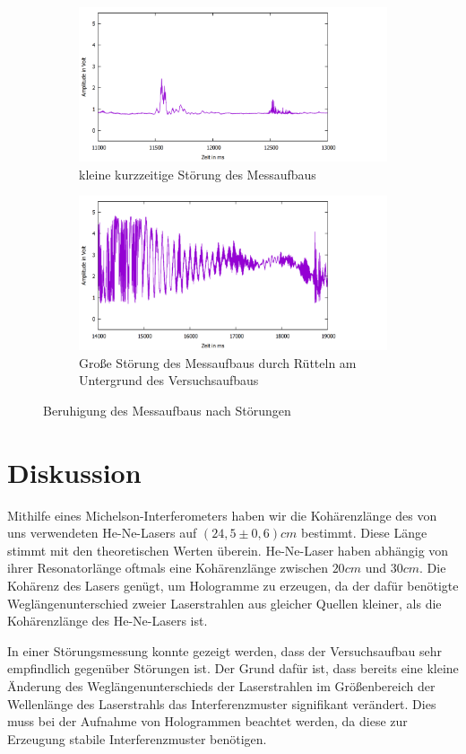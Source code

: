 \documentclass[10pt,a4paper]{article}
\begin{document}
	\begin{figure}[h]
		\centering
		\begin{subfigure}{0.8\textwidth}
			\centering
			\includegraphics[width=\textwidth]{abklingzeit1.png}
			\caption{kleine kurzzeitige Störung des Messaufbaus}
			\label{bea}
		\end{subfigure}
		\begin{subfigure}{0.8\textwidth}
			\centering
			\includegraphics[width=\textwidth]{abklingzeit2.png}
			\caption{Große Störung des Messaufbaus durch Rütteln am Untergrund des Versuchsaufbaus}
			\label{beb}
		\end{subfigure}
		
		\caption{Beruhigung des Messaufbaus nach Störungen}
		\label{be1}
	\end{figure}

\section{Diskussion}

Mithilfe eines Michelson-Interferometers haben wir die Kohärenzlänge des von uns verwendeten He-Ne-Lasers auf $(24,5 \pm 0,6)cm$ bestimmt. Diese Länge stimmt mit den theoretischen Werten überein. He-Ne-Laser haben abhängig von ihrer Resonatorlänge oftmals eine Kohärenzlänge zwischen $20cm$ und $30cm$. Die Kohärenz des Lasers genügt, um Hologramme zu erzeugen, da der dafür benötigte Weglängenunterschied zweier Laserstrahlen aus gleicher Quellen kleiner, als die Kohärenzlänge des He-Ne-Lasers ist.

In einer Störungsmessung konnte gezeigt werden, dass der Versuchsaufbau sehr empfindlich gegenüber Störungen ist. Der Grund dafür ist, dass bereits eine kleine Änderung des Weglängenunterschieds der Laserstrahlen im Größenbereich der Wellenlänge des Laserstrahls das Interferenzmuster signifikant verändert. Dies muss bei der Aufnahme von Hologrammen beachtet werden, da diese zur Erzeugung stabile Interferenzmuster benötigen.
\end{document}
